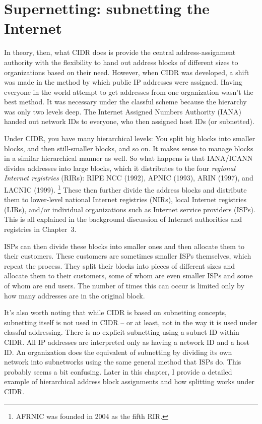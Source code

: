 \section{Supernetting: subnetting the Internet}

In theory, then, what CIDR does is provide the central
address-assignment authority with the flexibility to hand out address
blocks of different sizes to organizations based on their need. However,
when CIDR was developed, a shift was made in the method by which public
IP addresses were assigned. Having everyone in the world attempt to get
addresses from one organization wasn't the best method. It was necessary
under the classful scheme because the hierarchy was only two levels
deep. The Internet Assigned Numbers Authority (IANA) handed out network
IDs to everyone, who then assigned host IDs (or subnetted).

Under CIDR, you have many hierarchical levels: You split big blocks into
smaller blocks, and then still-smaller blocks, and so on. It makes sense
to manage blocks in a similar hierarchical manner as well.
So what happens is that IANA/ICANN divides addresses into large blocks, which it distributes to the four \emph{regional Internet registries} (RIRs):
RIPE NCC (1992), APNIC (1993), ARIN (1997), and LACNIC (1999).%
   \footnote{AFRNIC was founded in 2004 as the fifth RIR.}
These then further divide the address blocks and distribute them to lower-level national Internet registries (NIRs),
local Internet registries (LIRs), and/or individual organizations such as Internet
service providers (ISPs).
This is all explained in the background discussion of Internet authorities and registries in {Chapter~3}.

ISPs can then divide these blocks into smaller ones and then allocate
them to their customers. These customers are sometimes smaller ISPs
themselves, which repeat the process. They split their blocks into
pieces of different sizes and allocate them to their customers, some of
whom are even smaller ISPs and some of whom are end users. The number of
times this can occur is limited only by how many addresses are in the
original block.

It's also worth noting that while CIDR is based on subnetting concepts,
subnetting itself is not used in CIDR -- or at least, not in the way it
is used under classful addressing. There is no explicit subnetting using
a subnet ID within CIDR. All IP addresses are interpreted only as having
a network ID and a host ID. An organization does the equivalent of
subnetting by dividing its own network into subnetworks using the same
general method that ISPs do. This probably seems a bit confusing. Later
in this chapter, I provide a detailed example of hierarchical address
block assignments and how splitting works under CIDR.



